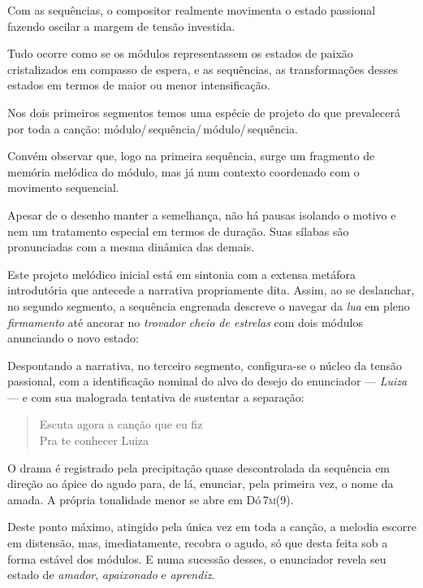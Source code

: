 Com as sequências, o compositor realmente movimenta o estado passional
fazendo oscilar a margem de tensão investida.

Tudo ocorre como se os módulos representassem os estados de paixão
cristalizados em compasso de espera, e as sequências, as transformações
desses estados em termos de maior ou menor intensificação.

Nos dois primeiros segmentos temos uma espécie de projeto do que
prevalecerá por toda a canção: módulo/\,sequência/\,módulo/\,sequência.



Convém observar que, logo na primeira sequência, surge um fragmento de
memória melódica do módulo, mas já num contexto coordenado com o
movimento sequencial.


Apesar de o desenho manter a semelhança, não há pausas isolando o motivo
e nem um tratamento especial em termos de duração. Suas sílabas são
pronunciadas com a mesma dinâmica das demais.

Este projeto melódico inicial está em sintonia com a extensa metáfora
introdutória que antecede a narrativa propriamente dita. Assim, ao se
deslanchar, no segundo segmento, a sequência engrenada descreve o
navegar da \textit{lua} em pleno \textit{firmamento} até ancorar no \textit{trovador
cheio de estrelas} com dois módulos anunciando o novo estado:


Despontando a narrativa, no terceiro segmento, configura-se o núcleo da
tensão passional, com a identificação nominal do alvo do desejo do
enunciador --- \textit{Luiza} --- e com sua malograda tentativa de sustentar a
separação:

\begin{verse}
Escuta agora a canção que eu fiz\\
Pra te conhecer Luiza
\end{verse}

O drama é registrado pela precipitação quase descontrolada da sequência
em direção ao ápice do agudo para, de lá, enunciar, pela primeira vez, o
nome da amada. A própria tonalidade menor se abre em Dó\,\textsc{7m(9)}.


Deste ponto máximo, atingido pela única vez em toda a canção, a melodia
escorre em distensão, mas, imediatamente, recobra o agudo, só que desta
feita sob a forma estável dos módulos. E numa sucessão desses, o
enunciador revela seu estado de \textit{amador}, \textit{apaixonado} e
\textit{aprendiz}.

